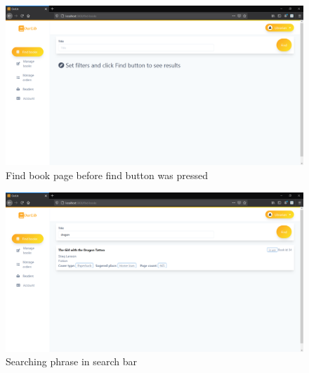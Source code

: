 \begin{figure}[H]
    \centering
    \includegraphics[width=\textwidth]{Include/Resources/FrontendScreens/React/librarianFindBooks.png}
    \caption{Find book page before find button was pressed}
    \label{fig:ScreenshotGUIlibrarianFindBooks}
\end{figure}




\begin{figure}[H]
    \centering
    \includegraphics[width=\textwidth]{Include/Resources/FrontendScreens/React/librarianFindBooks2.png}
    \caption{Searching phrase in search bar}
    \label{fig:ScreenshotGUIlibrarianFindBooks2}
\end{figure}




